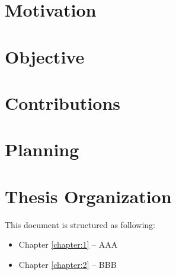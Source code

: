 
\section{Motivation}
\section{Objective}
\section{Contributions}
\section{Planning}
\section{Thesis Organization}


This document is structured as following: 
\begin{itemize}
\item Chapter \ref{chapter:1} – AAA 
\item Chapter \ref{chapter:2} – BBB 
\end{itemize}
